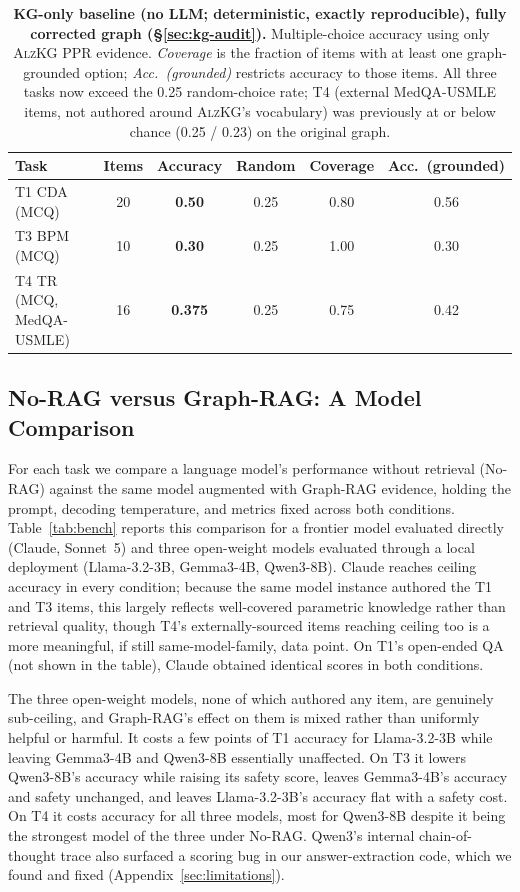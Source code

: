\documentclass{article}
\begin{document}
\begin{table}[t]
\centering
\caption{\textbf{KG-only baseline (no LLM; deterministic, exactly reproducible), fully corrected graph (\S\ref{sec:kg-audit}).} Multiple-choice accuracy using only \textsc{AlzKG} PPR evidence. \emph{Coverage} is the fraction of items with at least one graph-grounded option; \emph{Acc.\ (grounded)} restricts accuracy to those items. All three tasks now exceed the 0.25 random-choice rate; T4 (external MedQA-USMLE items, not authored around \textsc{AlzKG}'s vocabulary) was previously at or below chance (0.25 / 0.23) on the original graph.}
\label{tab:kgbaseline}
\small
\begin{tabular}{l c c c c c}
\toprule
\textbf{Task} & \textbf{Items} & \textbf{Accuracy} & \textbf{Random} & \textbf{Coverage} & \textbf{Acc.\ (grounded)} \\
\midrule
T1 CDA (MCQ)          & 20 & \textbf{0.50} & 0.25 & 0.80 & 0.56 \\
T3 BPM (MCQ)           & 10 & \textbf{0.30} & 0.25 & 1.00 & 0.30 \\
T4 TR (MCQ, MedQA-USMLE) & 16 & \textbf{0.375} & 0.25 & 0.75 & 0.42 \\
\bottomrule
\end{tabular}
\end{table}

\subsection{No-RAG versus Graph-RAG: A Model Comparison}
\label{sec:bench-protocol}
For each task we compare a language model's performance without retrieval (No-RAG) against the same model augmented with Graph-RAG evidence, holding the prompt, decoding temperature, and metrics fixed across both conditions. Table~\ref{tab:bench} reports this comparison for a frontier model evaluated directly (Claude, Sonnet~5) and three open-weight models evaluated through a local deployment (Llama-3.2-3B, Gemma3-4B, Qwen3-8B). Claude reaches ceiling accuracy in every condition; because the same model instance authored the T1 and T3 items, this largely reflects well-covered parametric knowledge rather than retrieval quality, though T4's externally-sourced items reaching ceiling too is a more meaningful, if still same-model-family, data point. On T1's open-ended QA (not shown in the table), Claude obtained identical scores in both conditions.

The three open-weight models, none of which authored any item, are genuinely sub-ceiling, and Graph-RAG's effect on them is mixed rather than uniformly helpful or harmful. It costs a few points of T1 accuracy for Llama-3.2-3B while leaving Gemma3-4B and Qwen3-8B essentially unaffected. On T3 it lowers Qwen3-8B's accuracy while raising its safety score, leaves Gemma3-4B's accuracy and safety unchanged, and leaves Llama-3.2-3B's accuracy flat with a safety cost. On T4 it costs accuracy for all three models, most for Qwen3-8B despite it being the strongest model of the three under No-RAG. Qwen3's internal chain-of-thought trace also surfaced a scoring bug in our answer-extraction code, which we found and fixed (Appendix~\ref{sec:limitations}).
\end{document}
